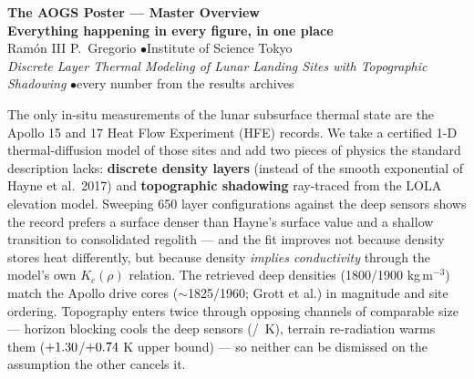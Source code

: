 \documentclass[11pt]{article}
\newcommand{\shead}[1]{\medskip\noindent{\color{teal}\large\bfseries #1}\par
  \nobreak\vspace{-2pt}{\color{teal}\rule{\linewidth}{0.6pt}}\par\smallskip}
\begin{document}
\thispagestyle{empty}

\begin{center}
{\LARGE\bfseries The AOGS Poster --- Master Overview}\\[2pt]
{\large\color{teal}\bfseries Everything happening in every figure, in one place}\\[4pt]
{\small Ram\'on III P.\ Gregorio \quad$\bullet$\quad Institute of Science Tokyo}\\[-1pt]
{\footnotesize\color{dim} \emph{Discrete Layer Thermal Modeling of Lunar Landing
 Sites with Topographic Shadowing} \quad$\bullet$\quad every number from the results archives}
\end{center}
\vspace{1pt}{\color{teal}\rule{\linewidth}{0.9pt}}

\shead{The study in five sentences}
The only in-situ measurements of the lunar subsurface thermal state are the
Apollo 15 and 17 Heat Flow Experiment (HFE) records. We take a certified 1-D
thermal-diffusion model of those sites and add two pieces of physics the
standard description lacks: \textbf{discrete density layers} (instead of the
smooth exponential of Hayne et al.\ 2017) and \textbf{topographic shadowing}
ray-traced from the LOLA elevation model. Sweeping 650 layer configurations
against the deep sensors shows the record prefers a surface denser than
Hayne's surface value and a shallow transition to consolidated regolith --- and
the fit improves not because density stores heat differently, but because
density \emph{implies conductivity} through the model's own $K_c(\rho)$
relation. The retrieved deep densities (1800/1900 kg\,m$^{-3}$) match the
Apollo drive cores (${\sim}$1825/1960; Grott et al.) in magnitude and site
ordering. Topography enters twice through opposing channels of comparable
size --- horizon blocking cools the deep sensors
(\shadowcoolAfif/\shadowcoolAsev\ K), terrain re-radiation warms them
($+1.30$/$+0.74$ K upper bound) --- so neither can be
dismissed on the assumption the other cancels it.
\end{document}
